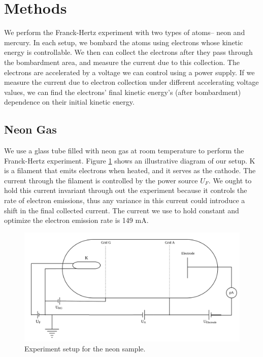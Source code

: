 \documentclass[prb,preprint]{revtex4-1}
\begin{document}
\section{Methods}

We perform the Franck-Hertz experiment with two types of atoms-- neon and mercury. In each setup, we bombard the atoms using electrons whose kinetic energy is controllable. We then can collect the electrons after they pass through the bombardment area, and measure the current due to this collection. The electrons are accelerated by a voltage we can control using a power supply. If we measure the current due to electron collection under different accelerating voltage values, we can find the electrons' final kinetic energy's (after bombardment) dependence on their initial kinetic energy.

\subsection{Neon Gas}

We use a glass tube filled with neon gas at room temperature to perform the Franck-Hertz experiment. Figure \ref{figneon} shows an illustrative diagram of our setup. K is a filament that emits electrons when heated, and it serves as the cathode. The current through the filament is controlled by the power source $U_{F}$. We ought to hold this current invariant through out the experiment because it controls the rate of electron emissions, thus any variance in this current could introduce a shift in the final collected current. The current we use to hold constant and optimize the electron emission rate is 149 mA.

\begin{figure}
    \centering
    \includegraphics[width=\textwidth]{figneon.png}
    \caption{Experiment setup for the neon sample.}
    \label{figneon}
    \end{figure}
\end{document}
